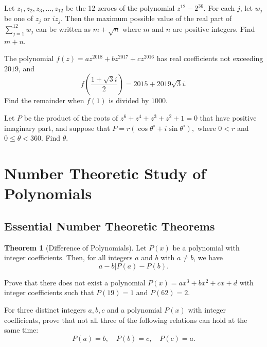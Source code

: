 \documentclass[12pt,a4paper]{memoir}
\theoremstyle{definition}
\newtheorem{theorem}{Theorem}
\begin{document}
\begin{question}[name={2011 AIME II \#8}]
	Let $z_1,z_2,z_3,\dots,z_{12}$ be the 12 zeroes of the polynomial $z^{12}-2^{36}$. For each $j$, let $w_j$ be one of $z_j$ or $i z_j$. Then the maximum possible value of the real part of $\displaystyle\sum_{j=1}^{12} w_j$ can be written as $m+\sqrt{n}$ where $m$ and $n$ are positive integers. Find $m+n$.
\end{question}


\begin{question}[name={2019 AIME II \#8}]
	The polynomial $f(z)=az^{2018}+bz^{2017}+cz^{2016}$ has real coefficients not exceeding $2019$, and 
	\[f\left(\dfrac{1+\sqrt{3}i}{2}\right)=2015+2019\sqrt{3}i.\] Find the remainder when $f(1)$ is divided by $1000$.
\end{question}


\begin{question}[name={1996 AIME \#11}]
	Let $P$ be the product of the roots of $z^6+z^4+z^3+z^2+1=0$ that have positive imaginary part, and suppose that $P=r(\cos \theta^\circ+i\sin \theta^\circ),$ where $0<r$ and $0\le \theta <360.$ Find $\theta.$
\end{question}


\newpage
% 
\section{Number Theoretic Study of Polynomials}
\subsection{Essential Number Theoretic Theorems}
\begin{theorem}[Difference of Polynomials]
	Let $P(x)$ be a polynomial with integer coefficients. Then, for all integers $a$ and $b$ with $a\neq b$, we have \[a - b | P(a) - P(b).\]
\end{theorem}

\begin{question}[name={1962 Russia}]
	Prove that there does not exist a polynomial $P(x)=ax^3+bx^2+cx+d$ with integer coefficients such that $P(19)=1$ and $P(62)=2$.
\end{question}

\begin{question}[name={1974 USA}]
	For three distinct integers $a,b,c$ and a polynomial $P(x)$ with integer coefficients, prove that not all three of the following relations can hold at the same time:
	\[P(a)=b, \quad P(b)=c, \quad P(c)=a.\]
\end{question}
\end{document}
